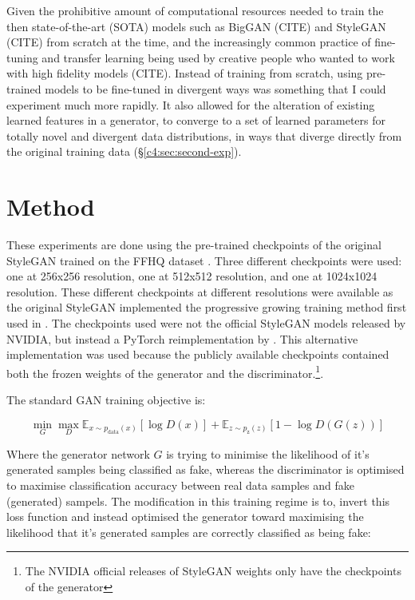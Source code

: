 Given the prohibitive amount of computational resources needed to train the then state-of-the-art (SOTA) models such as BigGAN (CITE) and StyleGAN (CITE) from scratch at the time, and the increasingly common practice of fine-tuning and transfer learning being used by creative people who wanted to work with high fidelity models (CITE). 
Instead of training from scratch, using pre-trained models to be fine-tuned in divergent ways was something that I could experiment much more rapidly. 
It also allowed for the alteration of existing learned features in a generator, to converge to a set of learned parameters for totally novel and divergent data distributions, in ways that diverge directly from the original training data (\S \ref{c4:sec:second-exp}). 


\section{Method}
\label{c4:sec:method}

These experiments are done using the pre-trained checkpoints of the original StyleGAN trained on the FFHQ dataset \citep{karras2019style}. 
Three different checkpoints were used: one at 256x256 resolution, one at 512x512 resolution, and one at 1024x1024 resolution. 
These different checkpoints at different resolutions were available as the original StyleGAN implemented the progressive growing training method first used in \cite{karras2017progressive}.
The checkpoints used were not the official StyleGAN models released by NVIDIA, but instead a PyTorch reimplementation by \cite{rosinality2019style}.
This alternative implementation was used because the publicly available checkpoints contained both the frozen weights of the generator and the discriminator.\footnote{The NVIDIA official releases of StyleGAN weights only have the checkpoints of the generator}.

The standard GAN training objective is:

\begin{equation} 
\min_{G}\max_{D}\mathbb{E}_{x\sim p_{\text{data}}(x)}[\log{D(x)}] +  \mathbb{E}_{z\sim p_{\text{z}}(z)}[1 - \log{D(G(z))}]
\end{equation}

Where the generator network $G$ is trying to minimise the likelihood of it's generated samples being classified as fake, whereas the discriminator is optimised to maximise classification accuracy between real data samples and fake (generated) sampels.
The modification in this training regime is to, invert this loss function and instead optimised the generator toward maximising the likelihood that it's generated samples are correctly classified as being fake:

